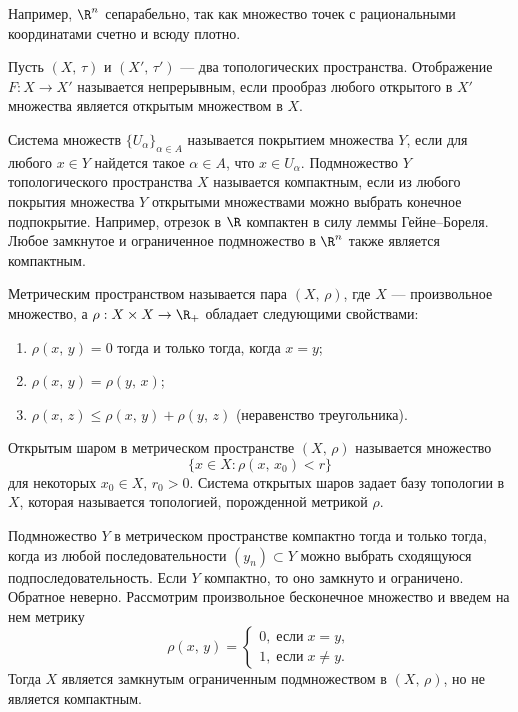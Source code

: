 \documentclass[a4paper
]{article}
\begin{document}
Например, $\R^n$ сепарабельно, так как множество точек с рациональными
координатами счетно и всюду плотно. \par
Пусть $(X, \, \tau)$ и $(X', \, \tau')$ --- два топологических
пространства. Отображение $F:X\rightarrow X'$ называется непрерывным,
если прообраз любого открытого в $X'$ множества является открытым
множеством в $X$. \par
Система множеств $\{U_\alpha\}_{\alpha\in A}$ называется покрытием
множества $Y$, если для любого $x\in Y$ найдется такое $\alpha\in A$,
что $x\in U_\alpha$. Подмножество $Y$ топологического пространства
$X$ называется компактным, если из любого покрытия множества $Y$
открытыми множествами можно выбрать конечное подпокрытие. Например,
отрезок в $\R$ компактен в силу леммы Гейне--Бореля. Любое замкнутое
и ограниченное подмножество в $\R^n$ также является компактным. \par
\begin{Def}
Метрическим пространством называется пара $(X, \, \rho)$, где
$X$ --- произвольное множество, а $\rho:X\times X\rightarrow \R_+$
обладает следующими свойствами:
\begin{enumerate}
\item $\rho(x, \, y)=0$ тогда и только тогда, когда $x=y$;
\item $\rho(x, \, y)=\rho(y, \, x)$;
\item $\rho(x, \, z)\le \rho(x, \, y)+\rho(y, \, z)$ (неравенство
треугольника).
\end{enumerate}
\end{Def}
Открытым шаром в метрическом пространстве $(X, \, \rho)$ называется множество
$$\{x\in X:\rho(x, \, x_0)<r\}$$ для некоторых $x_0\in X$, $r_0>0$.
Система открытых шаров задает базу топологии в $X$, которая называется
топологией, порожденной метрикой $\rho$. \par
Подмножество $Y$ в метрическом пространстве компактно тогда и только
тогда, когда из любой последовательности $(y_n)\subset Y$ можно
выбрать сходящуюся подпоследовательность. Если $Y$ компактно, то
оно замкнуто и ограничено. Обратное неверно. Рассмотрим произвольное
бесконечное множество и введем на нем метрику $$\rho(x, \, y)=
\left\{ \begin{array}{l} 0, \; \text{если} \; x=y, \\ 1, \;
\text{если} \; x\ne y.\end{array}\right.$$ Тогда $X$ является замкнутым
ограниченным подмножеством в $(X, \, \rho)$, но не является компактным. \par
\end{document}
